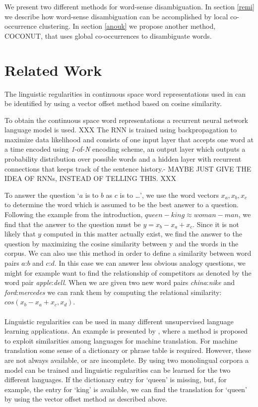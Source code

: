 \documentclass[11pt]{article}
\begin{document}
We present two different methods for word-sense disambiguation. In section \ref{remi} we describe how word-sense disambiguation can be accomplished by local co-occurrence clustering. In section \ref{anouk} we propose another method, COCONUT, that uses global co-occurrences to disambiguate words.

\section{Related Work}
The linguistic regularities in continuous space word representations used in \cite{Mikolov:13} can be identified by using a vector offset method based on cosine similarity. 

To obtain the continuous space word representations a recurrent neural network language model is used. 
XXX The RNN is trained using backpropagation to maximize data likelihood and consists of one input layer that accepts one word at a time encoded using \textit{1}-of-\textit{N} encoding scheme, an output layer which outputs a probability distribution over possible words and a hidden layer with recurrent connections that keeps track of the sentence history.- MAYBE JUST GIVE THE IDEA OF RNNs, INSTEAD OF TELLING THIS. XXX

To answer the question `$a$ is to $b$ as $c$ is to \dots', we use the word vectors $x_a, x_b, x_c$ to determine the word which is assumed to be the best answer to a question. Following the example from the introduction, $\textit{queen} - \textit{king} \approx \textit{woman}  -\textit{man}$, we find that the answer to the question must be $y = x_b - x_a + x_c$. Since it is not likely that $y$ computed in this matter actually exist, we find the answer to the question by maximizing the cosine similarity between y and the words in the corpus. We can also use this method in order to define a similarity between word pairs $a$:$b$ and $c$:$d$. In this case we can answer less obvious analogy questions, we might for example want to find the relationship of competitors as denoted by the word pair \textit{apple}:\textit{dell}. When we are given two new word pairs \textit{china}:\textit{nike} and \textit{ford}:\textit{mercedes} we can rank them by computing the relational similarity: $cos(x_b - x_a + x_c, x_d)$.\\\\
Linguistic regularities can be used in many different unsupervised language learning applications. An example is presented by \cite{MikolovMT:13}, where a method is proposed to exploit similarities among languages for machine translation. For machine translation some sense of a dictionary or phrase table is required. However, these are not always available, or are incomplete. By using two monolingual corpora a model can be trained and linguistic regularities can be learned for the two different languages. If the dictionary entry for `queen' is missing, but, for example, the entry for `king' is available, we can find the translation for `queen' by using the vector offset method as described above.
\end{document}
